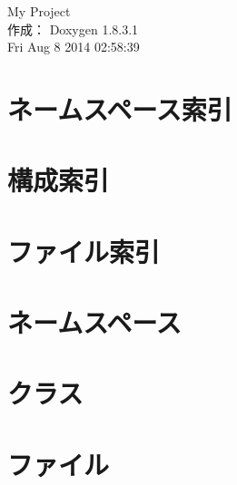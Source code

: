 \documentclass{book}
\begin{document}
\hypersetup{pageanchor=false,citecolor=blue}
\begin{titlepage}
\vspace*{7cm}
\begin{center}
{\Large My Project }\\
\vspace*{1cm}
{\large 作成： Doxygen 1.8.3.1}\\
\vspace*{0.5cm}
{\small Fri Aug 8 2014 02:58:39}\\
\end{center}
\end{titlepage}
\clearemptydoublepage
{}
\tableofcontents
\clearemptydoublepage
{}
\hypersetup{pageanchor=true,citecolor=blue}
\chapter{ネームスペース索引}

\chapter{構成索引}

\chapter{ファイル索引}

\chapter{ネームスペース}


\chapter{クラス}






\chapter{ファイル}













\printindex
\end{document}
